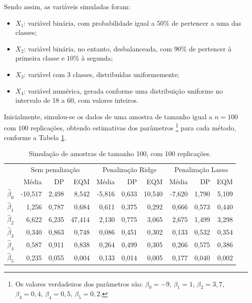 \documentclass[
  12pt,
]{article}
\begin{document}
\quad Sendo assim, as variáveis simuladas foram:

\begin{itemize}
\item $X_1$: variável binária, com probabilidade igual a $50\%$ de pertencer a uma das classes;
\item $X_2$: variável binária, no entanto, desbalanceada, com $90\%$ de pertencer à primeira classe e $10\%$ à segunda;
\item $X_3$: variável com 3 classes, distribuídas uniformemente;
\item $X_4$: variável numérica, gerada conforme uma distribuição uniforme no intervalo de 18 a 60, com valores inteiros.
\end{itemize}

\quad Inicialmente, simulou-se os dados de uma amostra de tamanho igual
a \(n = 100\) com \(100\) replicações, obtendo estimativas dos
parâmetros \footnote{Os valores verdadeiros dos parâmetros são:
  \(\beta_0=-9\), \(\beta_1=1\), \(\beta_2=3,7\), \(\beta_3=0,4\),
  \(\beta_4=0,5\), \(\beta_5=0,2\).} para cada método, conforme a Tabela
\ref{tab:tabsim1}.

\begin{table}[H]

\caption{\label{tab:tabsim1}Simulação de amostras de tamanho 100, com 100 replicações.}
\centering
\fontsize{10}{12}\selectfont
\begin{tabular}[t]{lrrrrrrrrr}
\toprule
\multicolumn{1}{c}{ } & \multicolumn{3}{c}{Sem penalização} & \multicolumn{3}{c}{Penalização Ridge} & \multicolumn{3}{c}{Penalização Lasso} \\
\cmidrule(l{3pt}r{3pt}){2-4} \cmidrule(l{3pt}r{3pt}){5-7} \cmidrule(l{3pt}r{3pt}){8-10}
  & Média & DP & EQM & Média & DP & EQM & Média & DP & EQM\\
\midrule
$\hat{\beta}_0$ & -10,517 & 2,498 & 8,542 & -5,816 & 0,633 & 10,540 & -7,620 & 1,790 & 5,109\\
$\hat{\beta}_1$ & 1,256 & 0,787 & 0,684 & 0,611 & 0,375 & 0,292 & 0,666 & 0,573 & 0,440\\
$\hat{\beta}_2$ & 6,622 & 6,235 & 47,414 & 2,130 & 0,775 & 3,065 & 2,675 & 1,499 & 3,298\\
$\hat{\beta}_3$ & 0,340 & 0,863 & 0,748 & 0,086 & 0,451 & 0,302 & 0,133 & 0,532 & 0,354\\
$\hat{\beta}_4$ & 0,587 & 0,911 & 0,838 & 0,264 & 0,499 & 0,305 & 0,266 & 0,575 & 0,386\\
$\hat{\beta}_5$ & 0,235 & 0,055 & 0,004 & 0,133 & 0,014 & 0,005 & 0,177 & 0,040 & 0,002\\
\bottomrule
\end{tabular}
\end{table}
\end{document}
